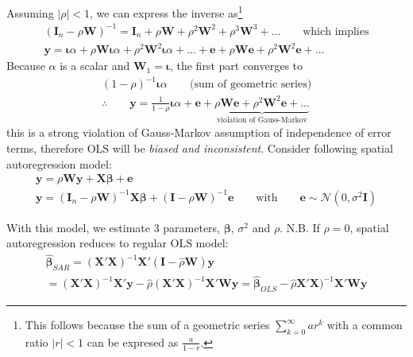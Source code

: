 Assuming $|\rho| < 1$, we can express the inverse as\footnote{This follows because the sum of a geometric series $\sum_{k=0}^{\infty}ar^k$ with a common ratio $|r| < 1$ can be expresed as $\frac{a}{1 - r}$.}
\begin{eqnarray}
(\boldsymbol{I}_n - \rho\boldsymbol{W})^{-1} = \boldsymbol{I}_n + \rho\boldsymbol{W} + \rho^{2}\boldsymbol{W}^{2} + \rho^{3}\boldsymbol{W}^{3} + ... \qquad \text{which implies}\\
\boldsymbol{y} = \boldsymbol{\iota}\alpha + \rho\boldsymbol{W}\boldsymbol{\iota}\alpha + \rho^2\boldsymbol{W}^2\boldsymbol{\iota}\alpha + ... + \boldsymbol{e} + \rho\boldsymbol{W}\boldsymbol{e} + \rho^2\boldsymbol{W}^2\boldsymbol{e} + ...
\end{eqnarray}
\noindent Because $\alpha$ is a scalar and $\boldsymbol{W}_{1} = \boldsymbol{\iota}$, the first part converges to
\begin{eqnarray}
(1 - \rho)^{-1}\boldsymbol{\iota}\alpha \qquad \text{(sum of geometric series)}\\
\therefore \qquad \boldsymbol{y} = \frac{1}{1-\rho}\boldsymbol{\iota}\alpha + \boldsymbol{e} + \underbrace{\rho\boldsymbol{W}\boldsymbol{e} + \rho^2\boldsymbol{W}^2\boldsymbol{e} + ...}_{\text{violation of Gauss-Markov}}
\end{eqnarray}
\noindent this is a strong violation of Gauss-Markov assumption of independence of error terms, therefore OLS will be \emph{biased and inconsistent}. Consider following spatial autoregression model:
\begin{eqnarray}
\boldsymbol{y} = \rho\boldsymbol{Wy} + \boldsymbol{X\beta} + \boldsymbol{e}\\
\boldsymbol{y} = (\boldsymbol{I}_n - \rho\boldsymbol{W})^{-1}\boldsymbol{X\beta} + (\boldsymbol{I} - \rho\boldsymbol{W})^{-1}\boldsymbol{e} \qquad \text{with} \qquad \boldsymbol{e}\sim\mathcal{N}(0,\sigma^{2}\boldsymbol{I})
\end{eqnarray}

With this model, we estimate 3 parameters, $\boldsymbol{\beta}$, $\sigma^{2}$ and $\rho$. N.B. If $\rho=0$, spatial autoregression reduces to regular OLS model:
\begin{eqnarray}
\hat{\boldsymbol{\beta}}_{SAR} = (\boldsymbol{X}'\boldsymbol{X})^{-1}\boldsymbol{X}'(\boldsymbol{I} - \hat{\rho}\boldsymbol{W})\boldsymbol{y}\\
 = (\boldsymbol{X}'\boldsymbol{X})^{-1}\boldsymbol{X}'\boldsymbol{y} - \hat{\rho}(\boldsymbol{X}'\boldsymbol{X})^{-1}\boldsymbol{X}'\boldsymbol{Wy}
 = \hat{\boldsymbol{\beta}}_{OLS} - \hat{\rho}\boldsymbol{X}'\boldsymbol{X})^{-1}\boldsymbol{X}'\boldsymbol{Wy}
\end{eqnarray}

